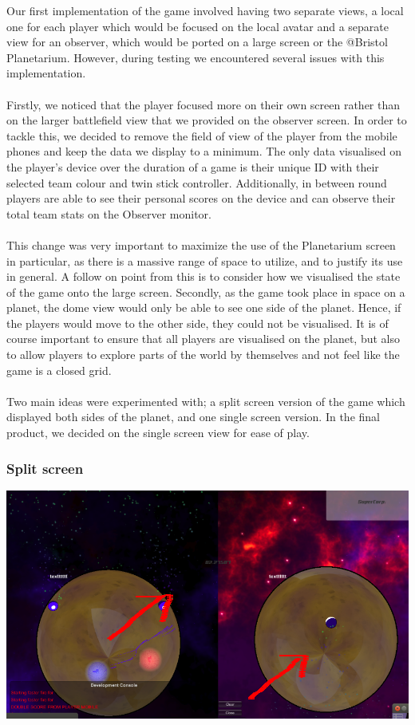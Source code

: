 \documentclass[11pt,a4paper]{article}
\begin{document}
   Our first implementation of the game involved having two separate views, a local one for each player which would be focused on the local avatar and a separate view for an observer, which would be ported on a large screen or the @Bristol Planetarium. However, during testing we encountered several issues with this implementation. \\ \\
   Firstly, we noticed that the player focused more on their own screen rather than on the larger battlefield view that we provided on the observer screen. In order to tackle this, we decided to remove the field of view of the player from the mobile phones and keep the data we display to a minimum. The only data visualised on the player’s device over the duration of a game is their unique ID with their selected team colour and twin stick controller. Additionally, in between round players are able to see their personal scores on the device and can observe their total team stats on the Observer monitor. \\ \\
   This change was very important to maximize the use of the Planetarium screen in particular, as there is a massive range of space to utilize, and to justify its use in general. A follow on point from this is to consider how we visualised the state of the game onto the large screen. 
   Secondly, as the game took place in space on a planet, the dome view would only be able to see one side of the planet. Hence, if the players would move to the other side, they could not be visualised. It is of course important to ensure that all players are visualised on the planet, but also to allow players to explore parts of the world by themselves and not feel like the game is a closed grid. \\ \\  
   Two main ideas were experimented with; a split screen version of the game which displayed both sides of the planet, and one single screen version. In the final product, we decided on the single screen view for ease of play.
   \subsubsection{Split screen} 
   \begin{center}
   \includegraphics[scale=0.2]{logos/split.png}
   \end{center}
   
\end{document}
